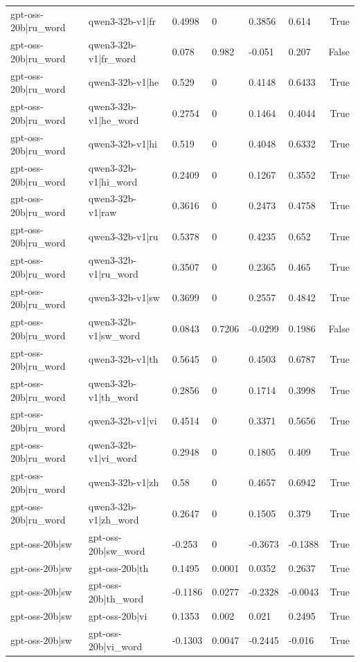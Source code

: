 \begin{table}
\begin{tabular}{llllllr}
gpt-oss-20b|ru_word & qwen3-32b-v1|fr & 0.4998 & 0 & 0.3856 & 0.614 & True \\
gpt-oss-20b|ru_word & qwen3-32b-v1|fr_word & 0.078 & 0.982 & -0.051 & 0.207 & False \\
gpt-oss-20b|ru_word & qwen3-32b-v1|he & 0.529 & 0 & 0.4148 & 0.6433 & True \\
gpt-oss-20b|ru_word & qwen3-32b-v1|he_word & 0.2754 & 0 & 0.1464 & 0.4044 & True \\
gpt-oss-20b|ru_word & qwen3-32b-v1|hi & 0.519 & 0 & 0.4048 & 0.6332 & True \\
gpt-oss-20b|ru_word & qwen3-32b-v1|hi_word & 0.2409 & 0 & 0.1267 & 0.3552 & True \\
gpt-oss-20b|ru_word & qwen3-32b-v1|raw & 0.3616 & 0 & 0.2473 & 0.4758 & True \\
gpt-oss-20b|ru_word & qwen3-32b-v1|ru & 0.5378 & 0 & 0.4235 & 0.652 & True \\
gpt-oss-20b|ru_word & qwen3-32b-v1|ru_word & 0.3507 & 0 & 0.2365 & 0.465 & True \\
gpt-oss-20b|ru_word & qwen3-32b-v1|sw & 0.3699 & 0 & 0.2557 & 0.4842 & True \\
gpt-oss-20b|ru_word & qwen3-32b-v1|sw_word & 0.0843 & 0.7206 & -0.0299 & 0.1986 & False \\
gpt-oss-20b|ru_word & qwen3-32b-v1|th & 0.5645 & 0 & 0.4503 & 0.6787 & True \\
gpt-oss-20b|ru_word & qwen3-32b-v1|th_word & 0.2856 & 0 & 0.1714 & 0.3998 & True \\
gpt-oss-20b|ru_word & qwen3-32b-v1|vi & 0.4514 & 0 & 0.3371 & 0.5656 & True \\
gpt-oss-20b|ru_word & qwen3-32b-v1|vi_word & 0.2948 & 0 & 0.1805 & 0.409 & True \\
gpt-oss-20b|ru_word & qwen3-32b-v1|zh & 0.58 & 0 & 0.4657 & 0.6942 & True \\
gpt-oss-20b|ru_word & qwen3-32b-v1|zh_word & 0.2647 & 0 & 0.1505 & 0.379 & True \\
gpt-oss-20b|sw & gpt-oss-20b|sw_word & -0.253 & 0 & -0.3673 & -0.1388 & True \\
gpt-oss-20b|sw & gpt-oss-20b|th & 0.1495 & 0.0001 & 0.0352 & 0.2637 & True \\
gpt-oss-20b|sw & gpt-oss-20b|th_word & -0.1186 & 0.0277 & -0.2328 & -0.0043 & True \\
gpt-oss-20b|sw & gpt-oss-20b|vi & 0.1353 & 0.002 & 0.021 & 0.2495 & True \\
gpt-oss-20b|sw & gpt-oss-20b|vi_word & -0.1303 & 0.0047 & -0.2445 & -0.016 & True \\

\end{tabular}
\end{table}
